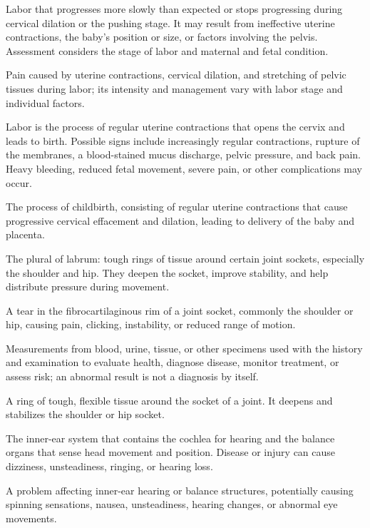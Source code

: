  Labor that progresses more slowly than expected or stops progressing during cervical dilation or the pushing stage. It may result from ineffective uterine contractions, the baby's position or size, or factors involving the pelvis. Assessment considers the stage of labor and maternal and fetal condition.

 Pain caused by uterine contractions, cervical dilation, and stretching of pelvic tissues during labor; its intensity and management vary with labor stage and individual factors.

 Labor is the process of regular uterine contractions that opens the cervix and leads to birth. Possible signs include increasingly regular contractions, rupture of the membranes, a blood-stained mucus discharge, pelvic pressure, and back pain. Heavy bleeding, reduced fetal movement, severe pain, or other complications may occur.

 The process of childbirth, consisting of regular uterine contractions that cause
progressive cervical effacement and dilation, leading to delivery of the baby and
placenta.

 The plural of labrum: tough rings of tissue around certain joint sockets, especially the shoulder and hip. They deepen the socket, improve stability, and help distribute pressure during movement.

 A tear in the fibrocartilaginous rim of a joint socket, commonly the shoulder or hip, causing pain, clicking, instability, or reduced range of motion.

 Measurements from blood, urine, tissue, or other specimens used with the history and examination to evaluate health, diagnose disease, monitor treatment, or assess risk; an abnormal result is not a diagnosis by itself.

 A ring of tough, flexible tissue around the socket of a joint. It deepens and stabilizes the shoulder or hip socket.

 The inner-ear system that contains the cochlea for hearing and the balance organs that sense head movement and position. Disease or injury can cause dizziness, unsteadiness, ringing, or hearing loss.

 A problem affecting inner-ear hearing or balance structures, potentially causing spinning sensations, nausea, unsteadiness, hearing changes, or abnormal eye movements.

